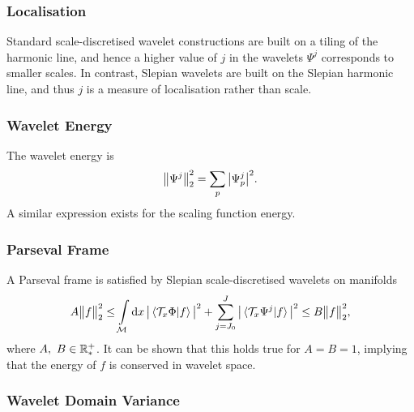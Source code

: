 \subsubsection{Localisation}\label{sec:chapter5_localisation}

Standard scale-discretised wavelet constructions are built on a tiling of the harmonic line, and hence a higher value of \(j\) in the wavelets \(\Psi^{j}\) corresponds to smaller scales.
In contrast, Slepian wavelets are built on the Slepian harmonic line, and thus \(j\) is a measure of localisation rather than scale.

\subsubsection{Wavelet Energy}

The wavelet energy is
%
\begin{equation}
	{\big\lVert\Psi^{j}\big\rVert}_{2}^{2}
	= \displaystyle\sum\limits_{p} \big\lvert{\Psi}_{p}^{j}\big\rvert^{2}.
\end{equation}
%
A similar expression exists for the scaling function energy.

\subsubsection{Parseval Frame}

A Parseval frame is satisfied by Slepian scale-discretised wavelets on manifolds
%
\begin{equation}
	A{\big\lVert f\big\rVert}_{2}^{2} \leq \displaystyle\int\limits_{\mathcal{M}} \dd{x}
	\big\lvert\braket*{\mathcal{T}_{x}\Phi}{f}\big\rvert^{2}
	+ \displaystyle\sum\limits_{j=J_{0}}^{J} \big\lvert\braket*{\mathcal{T}_{x}\Psi^{j}}{f}\big\rvert^{2}
	\leq B{\big\lVert f\big\rVert}_{2}^{2},
\end{equation}
%
where \(A,\ B \in \mathbb{R}_{\ast}^{+}{}\).
It can be shown that this holds true for \(A = B = 1\), implying that the energy of \(f\) is conserved in wavelet space.

\subsubsection{Wavelet Domain Variance}


